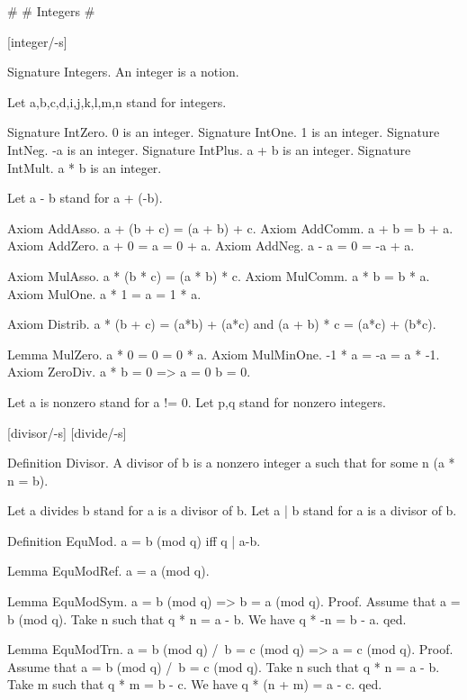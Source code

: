 \newtheorem{signature}{Signature} 
\newtheorem{axiom}{Axiom} 
\newcommand{\power}{{\cal P}} 
\newcommand{\preimg}[2]{{#1}^{-1}[#2]} 
\newcommand{\Seq}[2]{\{#1,\dots,#2\}}
\newcommand{\Set}[3]{\{#1_{#2},\dots,#1_{#3}\}}
\newcommand{\Product}[3]{\prod_{i=#2}^{#3}{#1}_i}
\newcommand{\subs}[2]{{#1}_{#2}}
\newcommand{\CC}{{\Bbb C}}
\newcommand{\RR}{{\Bbb R}}
\newcommand{\QQ}{{\Bbb Q}}
\newcommand{\ZZ}{{\Bbb Z}} 
\newcommand{\NN}{{\Bbb N}}

#
# Integers
#

[integer/-s]

Signature Integers. An integer is a notion.

Let a,b,c,d,i,j,k,l,m,n stand for integers.

Signature IntZero.  0 is an integer.
Signature IntOne.   1 is an integer.
Signature IntNeg.   -a is an integer.
Signature IntPlus.  a + b is an integer.
Signature IntMult.  a * b is an integer.

Let a - b stand for a + (-b).

Axiom AddAsso.      a + (b + c) = (a + b) + c.
Axiom AddComm.      a + b = b + a.
Axiom AddZero.      a + 0 = a = 0 + a.
Axiom AddNeg.       a - a = 0 = -a + a.

Axiom MulAsso.      a * (b * c) = (a * b) * c.
Axiom MulComm.      a * b = b * a.
Axiom MulOne.       a * 1 = a = 1 * a.

Axiom Distrib.      a * (b + c) = (a*b) + (a*c) and
                    (a + b) * c = (a*c) + (b*c).

Lemma MulZero.      a * 0 = 0 = 0 * a.
Axiom MulMinOne.    -1 * a = -a = a * -1.
Axiom ZeroDiv.      a * b = 0 => a = 0 \/ b = 0.

Let a is nonzero stand for a != 0.
Let p,q stand for nonzero integers.

[divisor/-s] [divide/-s]

Definition Divisor. A divisor of b is a nonzero integer a
                    such that for some n (a * n = b).

Let a divides b stand for a is a divisor of b.
Let a | b stand for a is a divisor of b.

Definition EquMod.  a = b (mod q) iff q | a-b.

Lemma EquModRef.    a = a (mod q).

Lemma EquModSym.    a = b (mod q) => b = a (mod q).
Proof.
    Assume that a = b (mod q).
    Take n such that q * n = a - b.
    We have q * -n = b - a.
qed.

Lemma EquModTrn.    a = b (mod q) /\ b = c (mod q) => a = c (mod q).
Proof.
    Assume that a = b (mod q) /\ b = c (mod q).
    Take n such that q * n = a - b.
    Take m such that q * m = b - c.
    We have q * (n + m) = a - c.
qed.

